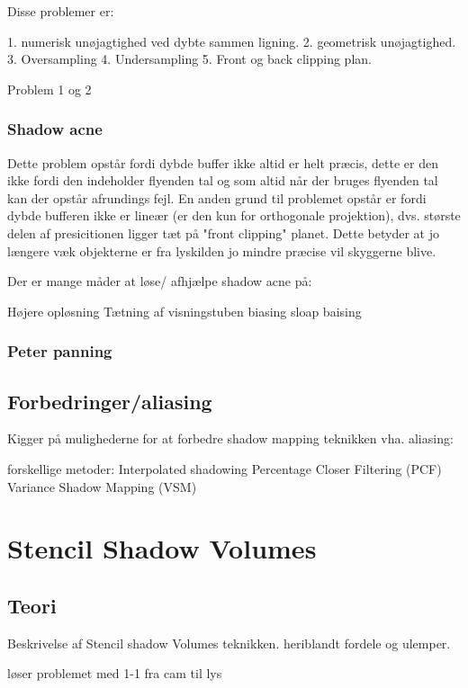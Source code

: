 \documentclass[11pt,a4paper]{article}
\begin{document}
Disse problemer er:

1. numerisk unøjagtighed ved dybte sammen ligning.
2. geometrisk unøjagtighed.
3. Oversampling
4. Undersampling
5. Front og back clipping plan.



Problem 1 og 2 
 
 
 
\subsubsection{Shadow acne}


Dette problem opstår fordi dybde buffer ikke altid er helt præcis, dette er den ikke fordi den indeholder flyenden tal og som altid når der bruges flyenden tal kan der opstår afrundings fejl. En anden grund til problemet opstår er fordi dybde bufferen ikke er lineær (er den kun for orthogonale projektion), dvs. største delen af presicitionen ligger tæt på "front clipping" planet. Dette betyder at jo længere væk objekterne er fra lyskilden jo mindre præcise vil skyggerne blive. 


Der er mange måder at løse/ afhjælpe shadow acne på:

Højere opløsning
Tætning af visningstuben
biasing
	sloap baising


\subsubsection{Peter panning}


\subsection{Forbedringer/aliasing}
Kigger på mulighederne for at forbedre shadow mapping teknikken vha. aliasing:

forskellige metoder:
Interpolated shadowing
Percentage Closer Filtering (PCF)
Variance Shadow Mapping (VSM)


\section{Stencil Shadow Volumes}

\subsection{Teori}
Beskrivelse af Stencil shadow Volumes teknikken. heriblandt fordele og ulemper.

løser problemet med 1-1 fra cam til lys
\end{document}
